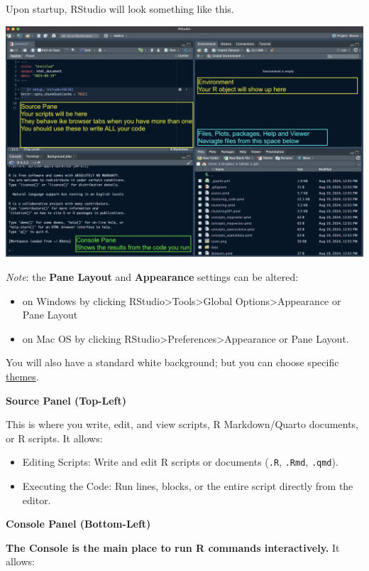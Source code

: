 \documentclass[
  letterpaper,
  DIV=11,
  numbers=noendperiod]{scrreprt}
\providecommand{\tightlist}{%
  \setlength{\itemsep}{0pt}\setlength{\parskip}{0pt}}\usepackage{longtable,booktabs,array}
\begin{document}
Upon startup, RStudio will look something like this.

\includegraphics[width=9.71in,height=\textheight,keepaspectratio]{labs/../img/environ_R_1.png}

\emph{Note}: the \textbf{Pane Layout} and \textbf{Appearance} settings
can be altered:

\begin{itemize}
\tightlist
\item
  on Windows by clicking RStudio\textgreater Tools\textgreater Global
  Options\textgreater Appearance or Pane Layout
\item
  on Mac OS by clicking
  RStudio\textgreater Preferences\textgreater Appearance or Pane Layout.
\end{itemize}

You will also have a standard white background; but you can choose
specific
\href{https://quarto.org/docs/output-formats/html-themes.html}{themes}.

\textbf{Source Panel (Top-Left)}

This is where you write, edit, and view scripts, R Markdown/Quarto
documents, or R scripts. It allows:

\begin{itemize}
\tightlist
\item
  Editing Scripts: Write and edit R scripts or documents (\texttt{.R},
  \texttt{.Rmd}, \texttt{.qmd}).
\item
  Executing the Code: Run lines, blocks, or the entire script directly
  from the editor.
\end{itemize}

\textbf{Console Panel (Bottom-Left)}

\textbf{The Console is the main place to run R commands interactively.}
It allows:
\end{document}
